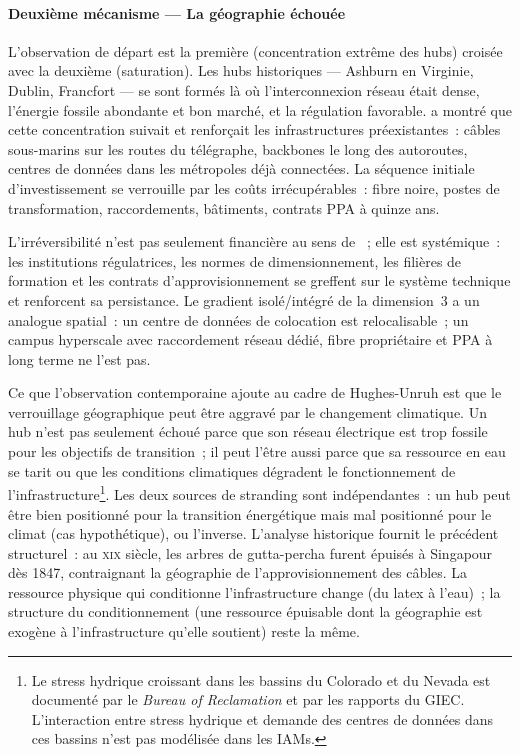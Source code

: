 \paragraph{Deuxième mécanisme --- La géographie échouée}

\markNEO \markSTS
L'observation de départ est la première (concentration extrême des hubs) croisée avec la deuxième (saturation). Les hubs historiques --- Ashburn en Virginie, Dublin, Francfort --- se sont formés là où l'interconnexion réseau était dense, l'énergie fossile abondante et bon marché, et la régulation favorable. \textcite{malecki_economic_2002} a montré que cette concentration suivait et renforçait les infrastructures préexistantes~: câbles sous-marins sur les routes du télégraphe, backbones le long des autoroutes, centres de données dans les métropoles déjà connectées. La séquence initiale d'investissement se verrouille par les coûts irrécupérables~: fibre noire, postes de transformation, raccordements, bâtiments, contrats PPA à quinze ans.

 L'irréversibilité n'est pas seulement financière au sens de \textcite{dixit_investment_1994}~; elle est systémique~: les institutions régulatrices, les normes de dimensionnement, les filières de formation et les contrats d'approvisionnement se greffent sur le système technique et renforcent sa persistance. Le gradient isolé/intégré de la dimension~3 a un analogue spatial~: un centre de données de colocation est relocalisable~; un campus hyperscale avec raccordement réseau dédié, fibre propriétaire et PPA à long terme ne l'est pas.

Ce que l'observation contemporaine ajoute au cadre de Hughes-Unruh est que le verrouillage géographique peut être aggravé par le changement climatique. Un hub n'est pas seulement échoué parce que son réseau électrique est trop fossile pour les objectifs de transition~; il peut l'être aussi parce que sa ressource en eau se tarit ou que les conditions climatiques dégradent le fonctionnement de l'infrastructure\footnote{Le stress hydrique croissant dans les bassins du Colorado et du Nevada est documenté par le \emph{Bureau of Reclamation} et par les rapports du GIEC. L'interaction entre stress hydrique et demande des centres de données dans ces bassins n'est pas modélisée dans les IAMs.}. Les deux sources de stranding sont indépendantes~: un hub peut être bien positionné pour la transition énergétique mais mal positionné pour le climat (cas hypothétique), ou l'inverse. L'analyse historique fournit le précédent structurel~: au \textsc{xix}\ieme{} siècle, les arbres de gutta-percha furent épuisés à Singapour dès 1847, contraignant la géographie de l'approvisionnement des câbles. La ressource physique qui conditionne l'infrastructure change (du latex à l'eau)~; la structure du conditionnement (une ressource épuisable dont la géographie est exogène à l'infrastructure qu'elle soutient) reste la même.

